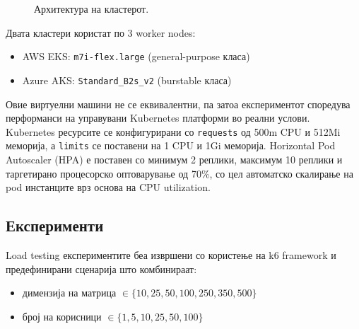 \documentclass{article}
\begin{document}
\begin{figure}[H]
{
}
\caption{Архитектура на кластерот.}
\label{fig:cluster-architecture}
\end{figure}


Двата кластери користат по 3 worker nodes:
\begin{itemize}
    \item AWS EKS: \texttt{m7i-flex.large} (general-purpose класа)
    \item Azure AKS: \texttt{Standard\_B2s\_v2} (burstable класа)
\end{itemize}

Овие виртуелни машини не се еквивалентни, па затоа експериментот споредува перформанси на управувани Kubernetes платформи во реални услови. Kubernetes ресурсите се конфигурирани со \texttt{requests} од 500m CPU и 512Mi меморија, а \texttt{limits} се поставени на 1 CPU и 1Gi меморија. Horizontal Pod Autoscaler (HPA) е поставен со минимум 2 реплики, максимум 10 реплики и таргетирано процесорско оптоварување од 70\%, со цел автоматско скалирање на pod инстанците врз основа на CPU utilization.

\subsection{Експерименти}

Load testing експериментите беа извршени со користење на k6 framework и предефинирани сценарија што комбинираат:
\begin{itemize}
    \item димензија на матрица $\in \{10, 25, 50, 100, 250, 350, 500\}$
    \item број на корисници $\in \{1, 5, 10, 25, 50, 100\}$
\end{itemize}
\end{document}

